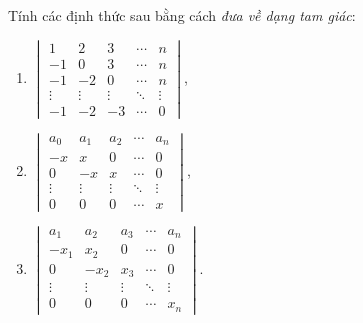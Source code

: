 \begin{exercise}
    Tính các định thức sau bằng cách \textit{đưa về dạng tam giác}:
    \begin{enumerate}[label = (\alph*)]
        \item $\begin{vmatrix} 1 & 2 & 3 & \cdots & n \\ -1 & 0 & 3 & \cdots & n \\ -1 & -2 & 0 & \cdots & n \\ \vdots & \vdots & \vdots & \ddots & \vdots \\ -1 & -2 & -3 & \cdots & 0 \end{vmatrix}$,
        \item $\begin{vmatrix} a_{0} & a_{1} & a_{2} & \cdots & a_{n} \\ -x & x & 0 & \cdots & 0 \\ 0 & -x & x & \cdots & 0 \\ \vdots & \vdots & \vdots & \ddots & \vdots \\ 0 & 0 & 0 & \cdots & x \end{vmatrix}$,
        \item $\begin{vmatrix} a_{1} & a_{2} & a_{3} & \cdots & a_{n} \\ -x_{1} & x_{2} & 0 & \cdots & 0 \\ 0 & -x_{2} & x_{3} & \cdots & 0 \\ \vdots & \vdots & \vdots & \ddots & \vdots \\ 0 & 0 & 0 & \cdots & x_{n} \end{vmatrix}$.
    \end{enumerate}
\end{exercise}

